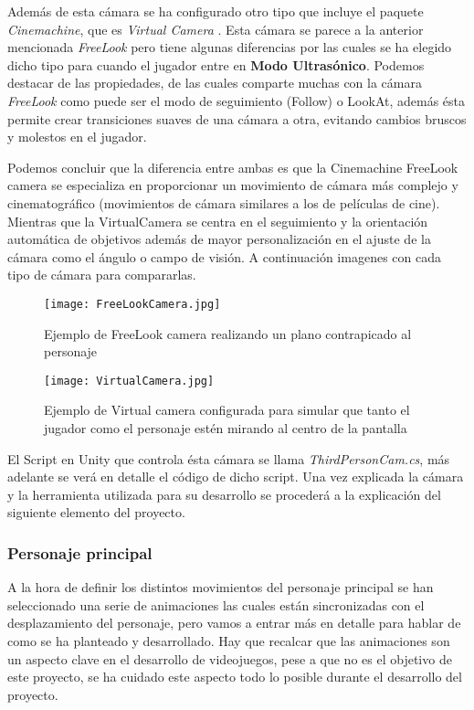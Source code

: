 Además de esta cámara se ha configurado otro tipo que incluye el paquete \textit{Cinemachine}, que es \textit{Virtual Camera} \cite{CinemachineVirtualCamera}. Esta cámara se parece a la anterior mencionada \textit{FreeLook} pero tiene algunas diferencias por las cuales se ha elegido dicho tipo para cuando el jugador entre en \textbf{Modo Ultrasónico}. Podemos destacar de las propiedades, de las cuales comparte muchas con la cámara \textit{FreeLook} como puede ser el modo de seguimiento (Follow) o LookAt, además ésta permite crear transiciones suaves de una cámara a otra, evitando cambios bruscos y molestos en el jugador. 

Podemos concluir que la diferencia entre ambas es que la Cinemachine FreeLook camera se especializa en proporcionar un movimiento de cámara más complejo y cinematográfico (movimientos de cámara similares a los de películas de cine). Mientras que la VirtualCamera se centra en el seguimiento y la orientación automática de objetivos además de mayor personalización en el ajuste de la cámara como el ángulo o campo de visión. A continuación imagenes con cada tipo de cámara para compararlas.

\begin{figure}[H]
    \centering
    \texttt{[image: FreeLookCamera.jpg]}
    \caption{Ejemplo de FreeLook camera realizando un plano contrapicado al personaje}
\end{figure}

\begin{figure}[H]
    \centering
    \texttt{[image: VirtualCamera.jpg]}
    \caption{Ejemplo de Virtual camera configurada para simular que tanto el jugador como el personaje estén mirando al centro de la pantalla}
\end{figure}

El Script en Unity
que controla ésta cámara se llama \textit{ThirdPersonCam.cs}, más adelante se verá en detalle el código de dicho script. 
Una vez explicada la cámara y la herramienta utilizada para su desarrollo se procederá a la explicación del siguiente elemento del proyecto.

\subsubsection{Personaje principal}

A la hora de definir los distintos movimientos del personaje principal se han seleccionado una serie 
de animaciones las cuales están sincronizadas con el desplazamiento del personaje, pero vamos a entrar más en detalle para hablar de como se 
ha planteado y desarrollado. Hay que recalcar que las animaciones son un aspecto clave en el desarrollo de videojuegos, pese a que no es el objetivo de este proyecto, se ha cuidado este aspecto todo lo posible durante el desarrollo del proyecto.\\

